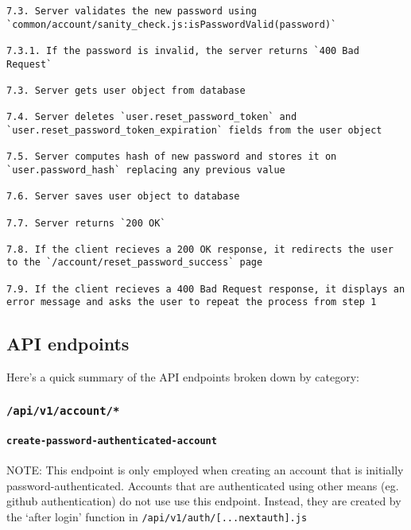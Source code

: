 \begin{verbatim}
7.3. Server validates the new password using `common/account/sanity_check.js:isPasswordValid(password)`

7.3.1. If the password is invalid, the server returns `400 Bad Request`

7.3. Server gets user object from database

7.4. Server deletes `user.reset_password_token` and `user.reset_password_token_expiration` fields from the user object

7.5. Server computes hash of new password and stores it on `user.password_hash` replacing any previous value

7.6. Server saves user object to database

7.7. Server returns `200 OK`

7.8. If the client recieves a 200 OK response, it redirects the user to the `/account/reset_password_success` page

7.9. If the client recieves a 400 Bad Request response, it displays an error message and asks the user to repeat the process from step 1
\end{verbatim}

\hypertarget{api-endpoints}{%
\subsection{API endpoints}\label{api-endpoints}}

Here's a quick summary of the API endpoints broken down by category:

\hypertarget{apiv1account}{%
\subsubsection{\texorpdfstring{\texttt{/api/v1/account/*}}{/api/v1/account/*}}\label{apiv1account}}

\hypertarget{create-password-authenticated-account}{%
\paragraph{\texorpdfstring{\texttt{create-password-authenticated-account}}{create-password-authenticated-account}}\label{create-password-authenticated-account}}

NOTE: This endpoint is only employed when creating an account that is
initially password-authenticated. Accounts that are authenticated using
other means (eg. github authentication) do not use use this endpoint.
Instead, they are created by the `after login' function in
\texttt{/api/v1/auth/{[}...nextauth{]}.js}

